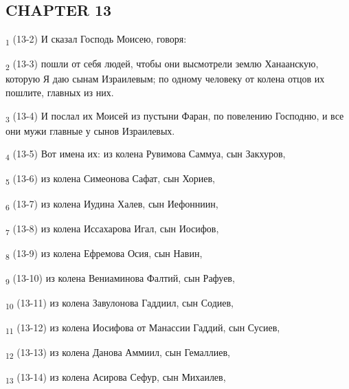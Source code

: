 \subsection{CHAPTER 13}
\begin{tcolorbox}
\textsubscript{1} (13-2) И сказал Господь Моисею, говоря:
\end{tcolorbox}
\begin{tcolorbox}
\textsubscript{2} (13-3) пошли от себя людей, чтобы они высмотрели землю Ханаанскую, которую Я даю сынам Израилевым; по одному человеку от колена отцов их пошлите, главных из них.
\end{tcolorbox}
\begin{tcolorbox}
\textsubscript{3} (13-4) И послал их Моисей из пустыни Фаран, по повелению Господню, и все они мужи главные у сынов Израилевых.
\end{tcolorbox}
\begin{tcolorbox}
\textsubscript{4} (13-5) Вот имена их: из колена Рувимова Саммуа, сын Закхуров,
\end{tcolorbox}
\begin{tcolorbox}
\textsubscript{5} (13-6) из колена Симеонова Сафат, сын Хориев,
\end{tcolorbox}
\begin{tcolorbox}
\textsubscript{6} (13-7) из колена Иудина Халев, сын Иефонниин,
\end{tcolorbox}
\begin{tcolorbox}
\textsubscript{7} (13-8) из колена Иссахарова Игал, сын Иосифов,
\end{tcolorbox}
\begin{tcolorbox}
\textsubscript{8} (13-9) из колена Ефремова Осия, сын Навин,
\end{tcolorbox}
\begin{tcolorbox}
\textsubscript{9} (13-10) из колена Вениаминова Фалтий, сын Рафуев,
\end{tcolorbox}
\begin{tcolorbox}
\textsubscript{10} (13-11) из колена Завулонова Гаддиил, сын Содиев,
\end{tcolorbox}
\begin{tcolorbox}
\textsubscript{11} (13-12) из колена Иосифова от Манассии Гаддий, сын Сусиев,
\end{tcolorbox}
\begin{tcolorbox}
\textsubscript{12} (13-13) из колена Данова Аммиил, сын Гемаллиев,
\end{tcolorbox}
\begin{tcolorbox}
\textsubscript{13} (13-14) из колена Асирова Сефур, сын Михаилев,
\end{tcolorbox}
